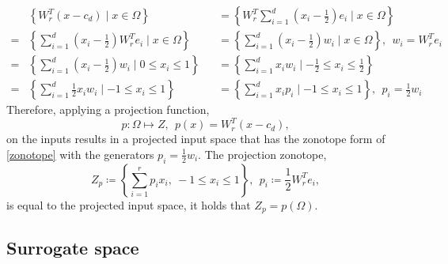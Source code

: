 \documentclass[
  a4paper,  %
  twoside,  %
  bibliography=totoc,
  headsepline,
  cleardoublepage=empty,
  parskip=half,
  draft=false
]{scrbook}
\begin{document}
\begin{equation}
\begin{alignedat}{2}
&\left\{W_r^T (x - c_d) \mid x \in \Omega\right\}&&=\left\{W_r^T \sum_{i=1}^d \left(x_i - \frac{1}{2}\right) e_i \mid x \in \Omega \right\}\\
=&\left\{\sum_{i=1}^d \left(x_i - \frac{1}{2}\right) W_r^T e_i \mid x \in \Omega \right\}&&=\left\{\sum_{i=1}^d \left(x_i - \frac{1}{2}\right) w_i \mid x \in \Omega \right\}, ~~ w_i=W_r^T e_i\\
=&\left\{\sum_{i=1}^d \left(x_i - \frac{1}{2}\right) w_i \mid 0 \leq x_i \leq 1 \right\}&&=\left\{\sum_{i=1}^d x_i w_i \mid -\frac{1}{2} \leq x_i \leq \frac{1}{2} \right\}\\
=&\left\{\sum_{i=1}^d \frac{1}{2} x_i w_i \mid -1 \leq x_i \leq 1 \right\}&&=\left\{\sum_{i=1}^d x_i p_i \mid -1 \leq x_i \leq 1 \right\}, ~~ p_i=\frac{1}{2} w_i
\label{zonotope_form}
\end{alignedat}
\end{equation}
%
Therefore, applying a projection function,
\begin{equation}
p \colon \Omega \mapsto Z, ~~ p(x)=W_r^T (x-c_d),
\nonumber
\end{equation}
on the inputs results in a projected input space that has the zonotope form of \cref{zonotope} with the generators $p_i=\frac{1}{2} w_i$.
The projection zonotope,
\begin{equation}
Z_{p} \coloneqq \left\{\sum_{i=1}^r p_i x_i , ~ -1 \leq x_i \leq 1\right\}, ~~ p_i \coloneqq \frac{1}{2} W_r^T e_i,
\end{equation}
is equal to the projected input space, \ie it holds that $Z_{p}=p(\Omega)$.

\subsection{Surrogate space}
\end{document}
